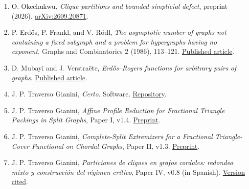 \documentclass[english,11pt,a4paper]{article}
\begin{document}
\begin{enumerate}
\item
  O. Okechukwu, \emph{Clique partitions and bounded simplicial defect}, preprint (2026). \href{https://arxiv.org/abs/2609.20871}{arXiv:2609.20871}.
\item
  P. Erdős, P. Frankl, and V. Rödl, \emph{The asymptotic number of graphs not containing a fixed subgraph and a problem for hypergraphs having no exponent}, Graphs and Combinatorics 2 (1986), 113--121. \href{https://doi.org/10.1007/BF01788085}{Published article}.
\item
  D. Mubayi and J. Verstraëte, \emph{Erdős--Rogers functions for arbitrary pairs of graphs}. \href{https://doi.org/10.1002/rsa.70078}{Published article}.
\item
  J. P. Traverso Gianini, \emph{Certo}. Software. \href{https://github.com/jtraverso/certo-math}{Repository}.
\item
  J. P. Traverso Gianini, \emph{Affine Profile Reduction for Fractional Triangle Packings in Split Graphs}, Paper I, v1.4. \href{https://github.com/jtraverso/erdos-81-chordal-clique-partitions/blob/main/preprints/PAPER_I/README.md}{Preprint}.
\item
  J. P. Traverso Gianini, \emph{Complete-Split Extremizers for a Fractional Triangle-Cover Functional on Chordal Graphs}, Paper II, v1.3. \href{https://github.com/jtraverso/erdos-81-chordal-clique-partitions/blob/main/preprints/PAPER_II/README.md}{Preprint}.
\item
  J. P. Traverso Gianini, \emph{Particiones de cliques en grafos cordales: redondeo mixto y construcción del régimen crítico}, Paper IV, v0.8 (in Spanish). \href{https://github.com/jtraverso/erdos-81-chordal-clique-partitions/blob/f783a792404a60983a7ef754d055fbe6c341188b/preprints/PAPER_IV/01_manuscript/PAPER_IV_preprint_v0.8_es.md}{Version cited}.
\end{enumerate}
\end{document}

